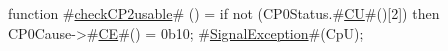 function #\hyperref[zcheckCP2usable]{checkCP2usable}# ()  =
  if not (CP0Status.#\hyperref[zCU]{CU}#()[2]) then {
    CP0Cause->#\hyperref[zCE]{CE}#() = 0b10;
    #\hyperref[zSignalException]{SignalException}#(CpU);
  }
